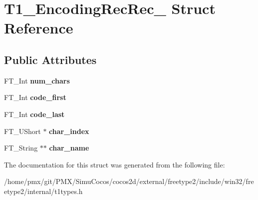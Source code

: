 \hypertarget{structT1__EncodingRecRec__}{}\section{T1\+\_\+\+Encoding\+Rec\+Rec\+\_\+ Struct Reference}
\label{structT1__EncodingRecRec__}
\subsection*{Public Attributes}
\begin{DoxyCompactItemize}
\item 
\mbox{\label{structT1__EncodingRecRec___af1468d5bad99cccebeb0387713999e9c}} 
F\+T\+\_\+\+Int {\bfseries num\+\_\+chars}
\item 
\mbox{\label{structT1__EncodingRecRec___ae21aad8cbb10c8fd94e9f30c60542662}} 
F\+T\+\_\+\+Int {\bfseries code\+\_\+first}
\item 
\mbox{\label{structT1__EncodingRecRec___a9be1faadf0ce11d12d3bce600e1f2a9d}} 
F\+T\+\_\+\+Int {\bfseries code\+\_\+last}
\item 
\mbox{\label{structT1__EncodingRecRec___a4510b3e031bd7006fbee7d1f54d20863}} 
F\+T\+\_\+\+U\+Short $\ast$ {\bfseries char\+\_\+index}
\item 
\mbox{\label{structT1__EncodingRecRec___a32e4abee85bc91cb60be0c4ac4c5e2e1}} 
F\+T\+\_\+\+String $\ast$$\ast$ {\bfseries char\+\_\+name}
\end{DoxyCompactItemize}


The documentation for this struct was generated from the following file\+:\begin{DoxyCompactItemize}
\item 
/home/pmx/git/\+P\+M\+X/\+Simu\+Cocos/cocos2d/external/freetype2/include/win32/freetype2/internal/t1types.\+h\end{DoxyCompactItemize}
